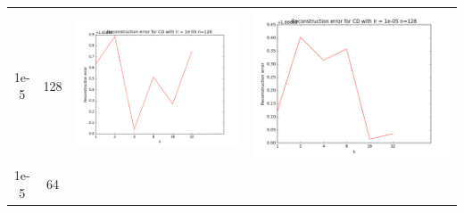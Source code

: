 \documentclass[12pt]{report}
\begin{document}
\begin{table}[H]
\begin{tabular}{ | c | c | c | c |}
\begin{minipage}{.3\textwidth}
    \end{minipage}
    \\ \hline
    1e-5 & 128 &
    \begin{minipage}{.3\textwidth}
      \includegraphics[scale=0.25]{train_cd_lr_0_00001_n_128.png}
    \end{minipage} &
    \begin{minipage}{.3\textwidth}
      \includegraphics[scale=0.25]{cd_lr_0_00001_n_128.png}
    \end{minipage}
    \\ \hline
    1e-5 & 64 &
    \begin{minipage}{.3\textwidth}

\end{minipage}
\end{tabular}
\end{table}
\end{document}
